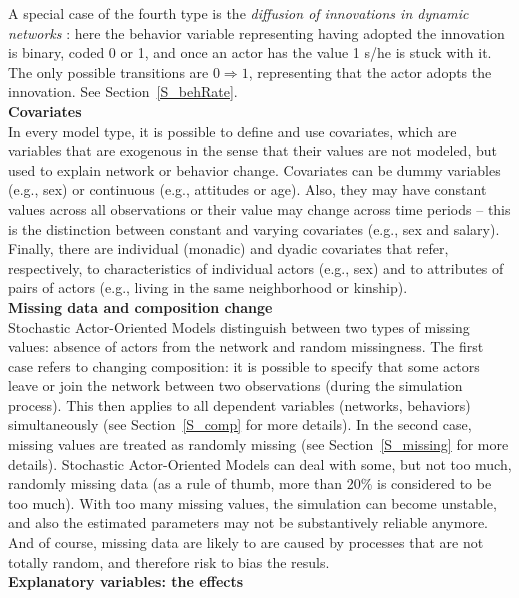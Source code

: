 \documentclass[a4paper,fleqn,11pt]{article}
\newcommand{\+}{\, + \,}
\newcommand{\saom}{{Stochastic Actor-Oriented Model}}
\begin{document}
A special case of the fourth type is the
\emph{diffusion of innovations in dynamic networks}
\citep{Greenan15}:
here the behavior variable representing
having adopted the innovation is binary, coded 0 or 1, and
once an actor has the value 1 s/he is stuck with it.
The only possible transitions are $0 \Rightarrow 1$, representing
that the actor adopts the innovation.
See Section~\ref{S_behRate}.\\

\noindent
\textbf{Covariates}\\

In every model type, it is possible to define and use covariates,
which are variables that are exogenous in the sense that
their values are not modeled, but used to explain network or behavior
change. Covariates can be dummy variables (e.g., sex)
or continuous (e.g., attitudes or age).
Also, they may have constant values across all observations or their
value may change across time periods -- this is the
distinction between constant and varying covariates
(e.g., sex and salary). Finally, there are
individual (monadic) and dyadic covariates that refer, respectively, to
characteristics of individual actors (e.g., sex) and to attributes
of pairs of actors (e.g., living in the same neighborhood or kinship).\\

\noindent
\textbf{Missing data and composition change}\\

{\saom}s distinguish between two types
of missing values: absence of actors from the network and
random missingness. The first case refers to changing composition:
it is possible to specify that some actors leave or join the
network between two observations (during the simulation process).
This then applies to all dependent variables (networks, behaviors)
simultaneously (see Section~\ref{S_comp} for more details).
In the second case, missing values are treated as randomly missing
(see Section~\ref{S_missing} for more details).
{\saom}s can deal with some, but not too much,
randomly missing data (as a rule of thumb, more than 20\% is
considered to be too much). With too many missing values,
the simulation can become unstable, and also the estimated
parameters may not be substantively reliable anymore.
And of course, missing data are likely to are caused by
processes that are not totally random, and therefore risk
to bias the resuls.\\

\noindent
\textbf{Explanatory variables: the effects}\\
\end{document}
